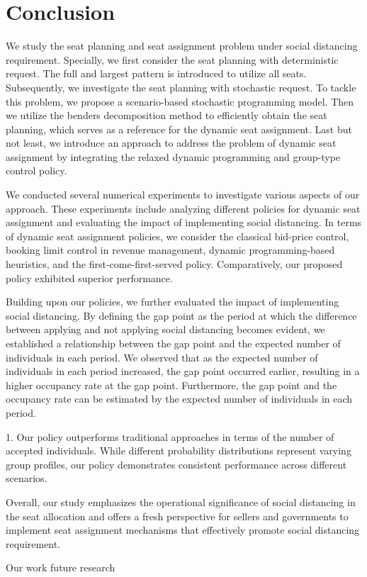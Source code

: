 \section{Conclusion}
We study the seat planning and seat assignment problem under social distancing requirement. 
Specially, we first consider the seat planning with deterministic request. The full and largest pattern is introduced to utilize all seats. Subsequently, we investigate the seat planning with stochastic request. To tackle this problem, we propose a scenario-based stochastic programming model. 
Then we utilize the benders decomposition method to efficiently obtain the seat planning, which serves as a reference for the dynamic seat assignment. Last but not least, we introduce an approach to address the problem of dynamic seat assignment by integrating the relaxed dynamic programming and group-type control policy.


We conducted several numerical experiments to investigate various aspects of our approach. These experiments include analyzing different policies for dynamic seat assignment and evaluating the impact of implementing social distancing. In terms of dynamic seat assignment policies, we consider the classical bid-price control, booking limit control in revenue management, dynamic programming-based heuristics, and the first-come-first-served policy. Comparatively, our proposed policy exhibited superior performance.

Building upon our policies, we further evaluated the impact of implementing social distancing. By defining the gap point as the period at which the difference between applying and not applying social distancing becomes evident, we established a relationship between the gap point and the expected number of individuals in each period. We observed that as the expected number of individuals in each period increased, the gap point occurred earlier, resulting in a higher occupancy rate at the gap point. Furthermore, the gap point and the occupancy rate can be estimated by the expected number of individuals in each period.


1. Our policy outperforms traditional approaches in terms of the number of accepted individuals. While different probability distributions represent varying group profiles, our policy demonstrates consistent performance across different scenarios.


Overall, our study emphasizes the operational significance of social distancing in the seat allocation and offers a fresh perspective for sellers and governments to implement seat assignment mechanisms that effectively promote social distancing requirement.


Our work future research  